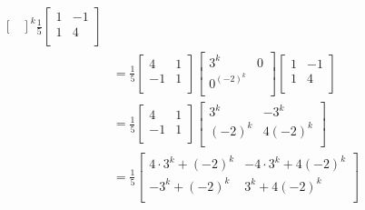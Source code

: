 \documentclass{article}
\begin{document}
\begin{example}
\begin{align*}
\begin{bmatrix}
    \end{bmatrix}^k\frac{1}{5}
    \begin{bmatrix}
      1 & -1 \\
      1 & 4  \\
    \end{bmatrix}      \\
        & = \frac{1}{5}
    \begin{bmatrix}
      4  & 1 \\
      -1 & 1 \\
    \end{bmatrix}
    \begin{bmatrix}
      3^k & 0    \\
      0 ^ (-2)^k \\
    \end{bmatrix}
    \begin{bmatrix}
      1 & -1 \\
      1 & 4  \\
    \end{bmatrix}      \\
        & = \frac{1}{5}
    \begin{bmatrix}
      4  & 1 \\
      -1 & 1 \\
    \end{bmatrix}
    \begin{bmatrix}
      3^k    & -3^k    \\
      (-2)^k & 4(-2)^k \\
    \end{bmatrix}    \\
        & = \frac{1}{5}
    \begin{bmatrix}
      4 \cdot 3^k + (-2)^k & -4 \cdot 3^k + 4(-2)^k \\
      -3^k + (-2)^k        & 3^k + 4(-2)^k          \\
    \end{bmatrix}
  \end{align*}
\end{example}
\end{document}
